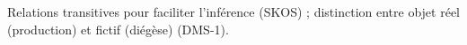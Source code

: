 






Relations transitives pour faciliter l'inférence (SKOS) ; distinction entre objet réel (production) et fictif (diégèse) (DMS-1).



